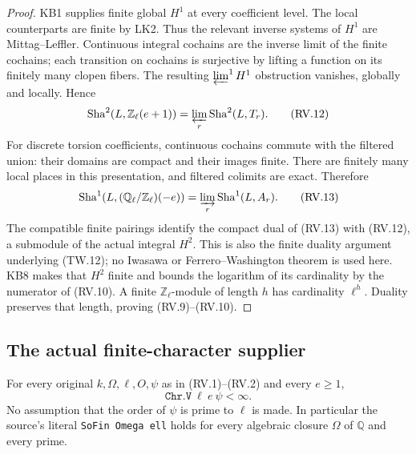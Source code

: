 \begin{proof}
KB1 supplies finite global $H^1$ at every coefficient level.
The local counterparts are finite by LK2.
Thus the relevant inverse systems of $H^1$ are Mittag--Leffler.
Continuous integral cochains are the inverse limit of the finite
cochains; each transition on cochains is surjective by lifting a
function on its finitely many clopen fibers.
The resulting $\varprojlim^1 H^1$ obstruction vanishes, globally
and locally.  Hence
\[
 \operatorname{Sha}^2(L,\mathbb Z_\ell(e+1))
       =\varprojlim_r\operatorname{Sha}^2(L,T_r).
 \tag{RV.12}
\]
For discrete torsion coefficients, continuous cochains commute with
the filtered union: their domains are compact and their images
finite.  There are finitely many local places in this presentation,
and filtered colimits are exact.  Therefore
\[
 \operatorname{Sha}^1(L,(\mathbb Q_\ell/\mathbb Z_\ell)(-e))
       =\varinjlim_r\operatorname{Sha}^1(L,A_r).
 \tag{RV.13}
\]
The compatible finite pairings identify the compact dual of
(RV.13) with (RV.12), a submodule of the actual integral $H^2$.
This is also the finite duality argument underlying (TW.12);
no Iwasawa or Ferrero--Washington theorem is used here.
KB8 makes that $H^2$ finite and bounds the logarithm of its
cardinality by the numerator of (RV.10).
A finite $\mathbb Z_\ell$-module of length $h$ has cardinality
$\ell^h$.  Duality preserves that length, proving (RV.9)--(RV.10).
\end{proof}

\subsection{The actual finite-character supplier}

\begin{theorem}
\label{claim:RV3}
For every original $k,\Omega,\ell,O,\psi$ as in (RV.1)--(RV.2)
and every $e\ge1$,
\[
                    \texttt{Chr.V}\ \ell\ e\ \psi<\infty .
 \tag{RV.14}
\]
No assumption that the order of $\psi$ is prime to $\ell$ is made.
In particular the source's literal \texttt{SoFin Omega ell} holds
for every algebraic closure $\Omega$ of $\mathbb Q$ and every prime.
\end{theorem}

